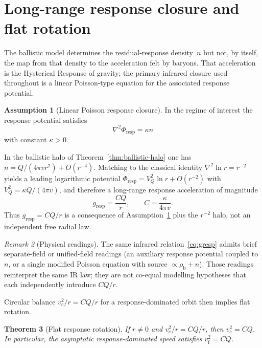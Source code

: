 \documentclass[11pt]{article}
\newtheorem{theorem}{Theorem}[section]
\theoremstyle{definition}
\newtheorem{assumption}[theorem]{Assumption}
\theoremstyle{remark}
\newtheorem{remark}[theorem]{Remark}
\newcommand{\vf}{v_{\mathrm{f}}}
\begin{document}
\section{Long-range response closure and flat rotation}
\label{sec:closure}
The ballistic model determines the residual-response density~$n$ but not, by itself, the map from that density to the acceleration felt by baryons.
That acceleration is the Hysterical Response of gravity; the primary infrared closure used throughout is a linear Poisson-type equation for the associated response potential.

\begin{assumption}[Linear Poisson response closure]
\label{ass:poisson}
In the regime of interest the response potential satisfies
\begin{equation}
  \nabla^{2}\Phi_{\mathrm{resp}}=\kappa n
\end{equation}
with constant $\kappa>0$.
\end{assumption}

In the ballistic halo of Theorem~\ref{thm:ballistic-halo} one has $n=Q/(4\pi v r^{2})+O(r^{-4})$.
Matching to the classical identity $\nabla^{2}\ln r=r^{-2}$ yields a leading logarithmic potential
$\Phi_{\mathrm{resp}}=V_{Q}^{2}\ln r+O(r^{-2})$ with $V_{Q}^{2}=\kappa Q/(4\pi v)$, and therefore a long-range response acceleration of magnitude
\begin{equation}
  g_{\mathrm{resp}}=\frac{CQ}{r},\qquad C=\frac{\kappa}{4\pi v}.
  \label{eq:gresp}
\end{equation}
Thus $g_{\mathrm{resp}}=CQ/r$ is a consequence of Assumption~\ref{ass:poisson} plus the $r^{-2}$ halo, not an independent free radial law.

\begin{remark}[Physical readings]
\label{rem:closure-readings}
The same infrared relation~\eqref{eq:gresp} admits brief separate-field or unified-field readings
(an auxiliary response potential coupled to $n$, or a single modified Poisson equation with source $\propto\rho_{\mathrm{b}}+n$).
Those readings reinterpret the same IR law; they are not co-equal modelling hypotheses that each independently introduce $CQ/r$.
\end{remark}

Circular balance $v_{c}^{2}/r=CQ/r$ for a response-dominated orbit then implies flat rotation.

\begin{theorem}[Flat response rotation]
\label{thm:flat-rotation}
If $r\neq0$ and $v_{c}^{2}/r=CQ/r$, then $v_{c}^{2}=CQ$.
In particular, the asymptotic response-dominated speed satisfies $\vf^{2}=CQ$.
\end{theorem}
\end{document}
